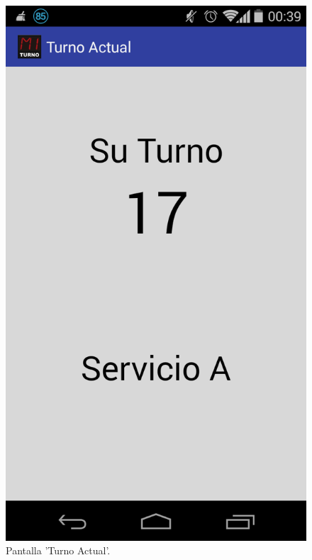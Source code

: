 \begin{figure}[H]
\centering
\includegraphics[scale=0.25]{images/capitulo5/turnoActual.png}
\caption{Pantalla 'Turno Actual'.}
\label{turnoActual}
\end{figure}

